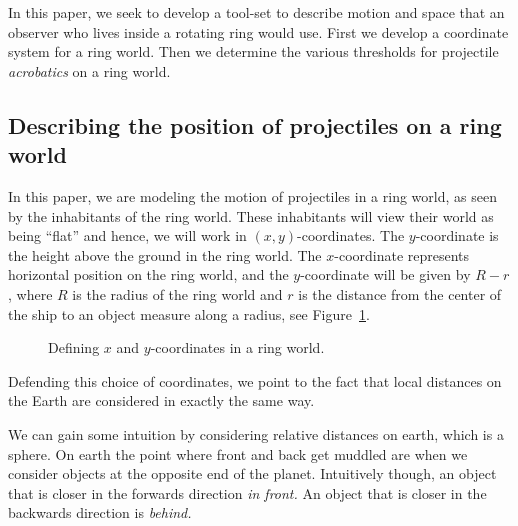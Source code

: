 \documentclass{amsart}
\theoremstyle{definition}
\begin{document}
In this paper, we seek to develop a tool-set to describe motion and space that an observer
 who lives inside a rotating ring would use. First we develop a coordinate system for a ring world. 
 Then we determine the various thresholds for projectile \textit{acrobatics} on a ring world. 


\subsection{Describing the position of projectiles on a ring world}

In this paper, we are modeling the motion of projectiles in a ring
world, as seen by the inhabitants of the ring world. These inhabitants
will view their world as being ``flat'' and hence, we will work in
$(x,y)$-coordinates.  The $y$-coordinate is the height above the
ground in the ring world.  The $x$-coordinate represents horizontal
position on the ring world, and the $y$-coordinate will be given by $R
- r$, where $R$ is the radius of the ring world and $r$ is the
distance from the center of the ship to an object measure along a
radius, see Figure~\ref{fig:vertical}.



\begin{figure}
  \caption{Defining $x$ and $y$-coordinates in a ring world.}
  \label{fig:vertical}
\end{figure}

Defending this choice of coordinates, we point to the fact that local
distances on the Earth are considered in exactly the same way. 


We can gain some intuition by considering relative distances
on earth, which is a sphere. On earth the point where front and back
get muddled are when we consider objects at the opposite end of the
planet. Intuitively though, an object that is closer in the forwards
direction \textit{in front.}  An object that is closer in the
backwards direction is \textit{behind.} \newline
\end{document}

